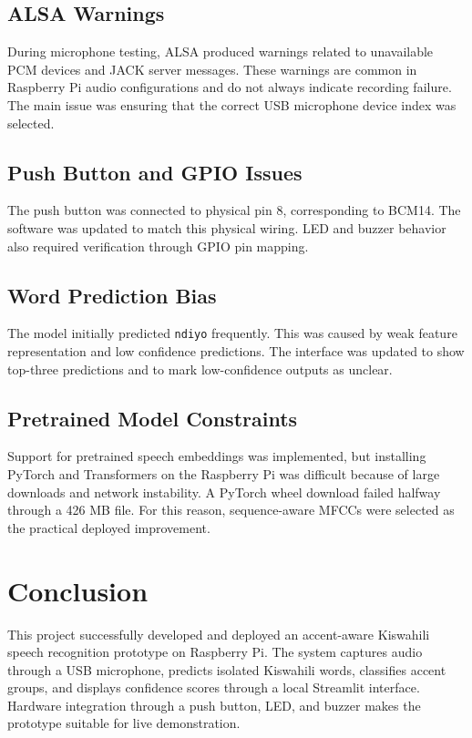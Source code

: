 \documentclass[12pt,a4paper]{report}
\begin{document}
\section{ALSA Warnings}
During microphone testing, ALSA produced warnings related to unavailable PCM devices and JACK server messages. These warnings are common in Raspberry Pi audio configurations and do not always indicate recording failure. The main issue was ensuring that the correct USB microphone device index was selected.

\section{Push Button and GPIO Issues}
The push button was connected to physical pin 8, corresponding to BCM14. The software was updated to match this physical wiring. LED and buzzer behavior also required verification through GPIO pin mapping.

\section{Word Prediction Bias}
The model initially predicted \texttt{ndiyo} frequently. This was caused by weak feature representation and low confidence predictions. The interface was updated to show top-three predictions and to mark low-confidence outputs as unclear.

\section{Pretrained Model Constraints}
Support for pretrained speech embeddings was implemented, but installing PyTorch and Transformers on the Raspberry Pi was difficult because of large downloads and network instability. A PyTorch wheel download failed halfway through a 426 MB file. For this reason, sequence-aware MFCCs were selected as the practical deployed improvement.

\chapter{Conclusion}

This project successfully developed and deployed an accent-aware Kiswahili speech recognition prototype on Raspberry Pi. The system captures audio through a USB microphone, predicts isolated Kiswahili words, classifies accent groups, and displays confidence scores through a local Streamlit interface. Hardware integration through a push button, LED, and buzzer makes the prototype suitable for live demonstration.
\end{document}
